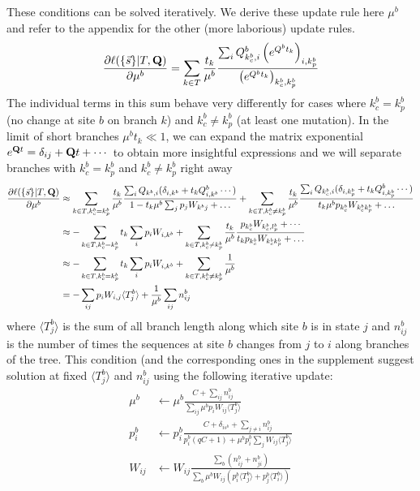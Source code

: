 \documentclass[aps,rmp, onecolumn]{revtex4}
\newcommand{\mat}[1]{{\bf #1}}
\newcommand{\eqp}{p}
\begin{document}
These conditions can be solved iteratively. We derive these update rule here $\mu^b$ and refer to the appendix for the other (more laborious) update rules.
\begin{equation}
	\frac{\partial \ell(\{\vec{s}\}|T,\mat{Q})}{\partial \mu^b} = \sum_{k\in T} \frac{t_k}{\mu^b}\frac{\sum_i Q^b_{k^b_c,i}\left( e^{Q^bt_k} \right)_{i, k^b_p}}{\left( e^{Q^bt_k} \right)_{k^b_c, k^b_p}}
\end{equation}
The individual terms in this sum behave very differently for cases where $k^b_c=k^b_p$ (no change at site $b$ on branch $k$) and $k^b_c\neq k^b_p$ (at least one mutation).
In the limit of short branches $\mu^b t_k\ll 1$, we can expand the matrix exponential $e^{\mat{Q}t}=\delta_{ij} + \mat{Q}t+\cdots$ to obtain more insightful expressions and we will separate branches with $k^b_c=k^b_p$  and $k^b_c\neq k^b_p$ right away
\begin{equation}
\begin{split}
	\frac{\partial \ell(\{\vec{s}\}|T,\mat{Q})}{\partial \mu^b} &\approx \sum_{k\in T, k^b_c=k^b_p} \frac{t_k}{\mu^b}\frac{\sum_i Q_{k^b,i}(\delta_{i,k^b} + t_k Q^b_{i,k^b}\cdots)}{1 - t_k\mu^b\sum_{j}\eqp_j W_{k^bj}+\ldots} +
	\sum_{k\in T, k^b_c\neq k^b_p} \frac{t_k}{\mu^b}\frac{\sum_i Q_{k^b_c,i}(\delta_{i,k^b_p} + t_k Q^b_{i,k^b_p}\cdots)}{t_k\mu^b\eqp_{k^b_c} W_{k^b_ck^b_p}+\ldots} \\
		&\approx -\sum_{k\in T, k^b_c=k^b_p}t_k \sum_i \eqp_{i}W_{i,k^b} +
	\sum_{k\in T, k^b_c\neq k^b_p} \frac{t_k}{\mu^b}\frac{p_{k^b_c}W_{k^b_c, l^b_p} + \cdots}{t_k\eqp_{k^b_c} W_{k^b_ck^b_p}+\ldots} \\
		&\approx -\sum_{k\in T, k^b_c=k^b_p}t_k \sum_i \eqp_{i}W_{i,k^b} + 	\sum_{k\in T, k^b_c\neq k^b_p} \frac{1}{\mu^b} \\
		&= -\sum_{ij}\eqp_{i}W_{i,j}\langle T_j^b\rangle + \frac{1}{\mu^b}\sum_{ij} n^b_{ij}
	\end{split}
\end{equation}
where $\langle T^b_j\rangle$ is the sum of all branch length along which site $b$ is in state $j$ and $n^b_{ij}$ is the number of times the sequences at site $b$ changes from $j$ to $i$ along branches of the tree.
This condition (and the corresponding ones in the supplement suggest solution at fixed $\langle T^b_j\rangle$ and $n^b_{ij}$ using the following iterative update:
\begin{equation}
\label{eq:update}
	\begin{split}
		\mu^b & \leftarrow \mu^b\frac{C+\sum_{ij} n^b_{ij}}{\sum_{ij}\mu^b \eqp_{i}W_{ij}\langle T_j^b\rangle} \\
		\eqp^b_i & \leftarrow \eqp^b_i\frac{C+\delta_{is^{b}} + \sum_{j\neq i} n^b_{ij}}{\eqp^b_i(qC+1) + \mu^b\eqp^b_i \sum_{j}W_{ij}\langle T_j^b\rangle} \\
		W_{ij} & \leftarrow W_{ij}\frac{\sum_b (n^b_{ij}+n^b_{ji})}{\sum_b \mu^b W_{ij}(\eqp_i^b\langle T_j^b\rangle + \eqp_j^b \langle T_i^b\rangle)} \\
	\end{split}
\end{equation}
\end{document}
